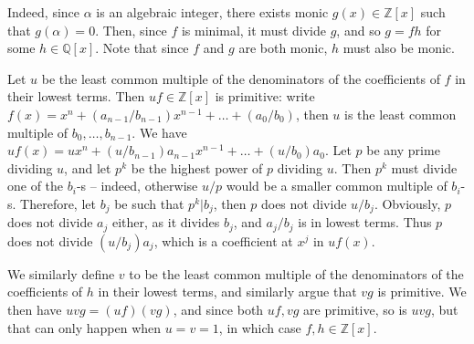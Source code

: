 \documentclass[notitlepage]{article}
\theoremstyle{definition}
\newcommand\Q{\mathbb{Q}}
\newcommand\Z{\mathbb{Z}}
\begin{document}
Indeed, since $\alpha$ is an algebraic integer, there exists monic
$g(x) \in \Z[x]$ such that $g(\alpha) = 0$. Then, since $f$ is
minimal, it must divide $g$, and so $g = fh$ for some $h \in
\Q[x]$. Note that since $f$ and $g$ are both monic, $h$ must also be
monic.

Let $u$ be the least common multiple of the denominators of the
coefficients of $f$ in their lowest terms. Then $uf \in \Z[x]$ is
primitive: write $f(x) = x^n + (a_{n-1}/b_{n-1}) x^{n-1} + \ldots +
(a_0/b_0)$, then $u$ is the least common multiple of $b_0, \ldots,
b_{n-1}$. We have $uf(x) = u x^n + (u/b_{n-1}) a_{n-1} x^{n-1} +
\ldots + (u/b_0) a_0$. Let $p$ be any prime dividing $u$, and let
$p^k$ be the highest power of $p$ dividing $u$. Then $p^k$ must divide
one of the $b_i$-s -- indeed, otherwise $u/p$ would be a smaller
common multiple of $b_i$-s. Therefore, let $b_j$ be such that $p^k |
b_j$, then $p$ does not divide $u/b_j$. Obviously, $p$ does not divide
$a_j$ either, as it divides $b_j$, and $a_j/b_j$ is in lowest
terms. Thus $p$ does not divide $(u/b_j)a_j$, which is a coefficient
at $x^j$ in $uf(x)$.

We similarly define $v$ to be the least common multiple of the
denominators of the coefficients of $h$ in their lowest terms, and
similarly argue that $vg$ is primitive. We then have $uvg = (uf)(vg)$,
and since both $uf, vg$ are primitive, so is $uvg$, but that can only
happen when $u = v = 1$, in which case $f, h \in \Z[x]$.
\end{document}
